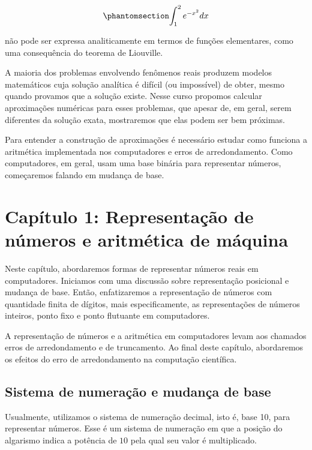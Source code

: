 \documentclass[
  a4paper,
  DIV=11,
  numbers=noendperiod,
  oneside]{scrreprt}
\begin{document}
\begin{equation}\phantomsection\label{eq-exemplo5}{
\int_1^2 e^{-x^2} dx
}\end{equation}

não pode ser expressa analiticamente em termos de funções elementares,
como uma consequência do teorema de Liouville.

A maioria dos problemas envolvendo fenômenos reais produzem modelos
matemáticos cuja solução analítica é difícil (ou impossível) de obter,
mesmo quando provamos que a solução existe. Nesse curso propomos
calcular aproximações numéricas para esses problemas, que apesar de, em
geral, serem diferentes da solução exata, mostraremos que elas podem ser
bem próximas.

Para entender a construção de aproximações é necessário estudar como
funciona a aritmética implementada nos computadores e erros de
arredondamento. Como computadores, em geral, usam uma base binária para
representar números, começaremos falando em mudança de base.

\part{Capítulo 1: Representação de números e aritmética de máquina}

Neste capítulo, abordaremos formas de representar números reais em
computadores. Iniciamos com uma discussão sobre representação posicional
e mudança de base. Então, enfatizaremos a representação de números com
quantidade finita de dígitos, mais especificamente, as representações de
números inteiros, ponto fixo e ponto flutuante em computadores.

A representação de números e a aritmética em computadores levam aos
chamados erros de arredondamento e de truncamento. Ao final deste
capítulo, abordaremos os efeitos do erro de arredondamento na computação
científica.

\chapter{Sistema de numeração e mudança de
base}\label{sec-sistema-de-numeracao-e-mudanca-de-base}

Usualmente, utilizamos o sistema de numeração decimal, isto é, base 10,
para representar números. Esse é um sistema de numeração em que a
posição do algarismo indica a potência de {\(10\)} pela qual seu valor é
multiplicado.
\end{document}
